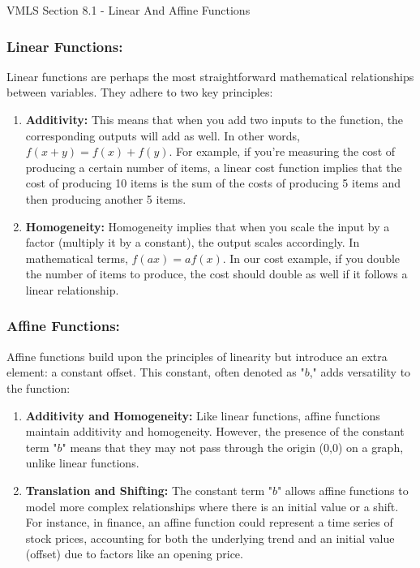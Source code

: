\begin{notes}{VMLS Section 8.1 - Linear And Affine Functions}
    \subsubsection*{Linear Functions:}

    Linear functions are perhaps the most straightforward mathematical relationships between variables. They adhere to two key principles:

    \begin{enumerate}
        \item \textbf{Additivity:} This means that when you add two inputs to the function, the corresponding outputs will add as well. In other words, $f(x + y) = f(x) + f(y)$. For example, if you're 
        measuring the cost of producing a certain number of items, a linear cost function implies that the cost of producing 10 items is the sum of the costs of producing 5 items and then producing 
        another 5 items.
        \item \textbf{Homogeneity:} Homogeneity implies that when you scale the input by a factor (multiply it by a constant), the output scales accordingly. In mathematical terms, $f(ax) = af(x)$. 
        In our cost example, if you double the number of items to produce, the cost should double as well if it follows a linear relationship.
    \end{enumerate}
    
    \subsubsection*{Affine Functions:}
    
    Affine functions build upon the principles of linearity but introduce an extra element: a constant offset. This constant, often denoted as "$b$," adds versatility to the function:

    \begin{enumerate}
        \item \textbf{Additivity and Homogeneity:} Like linear functions, affine functions maintain additivity and homogeneity. However, the presence of the constant term "$b$" means that they may not 
        pass through the origin (0,0) on a graph, unlike linear functions.
        \item \textbf{Translation and Shifting:} The constant term "$b$" allows affine functions to model more complex relationships where there is an initial value or a shift. For instance, in finance, 
        an affine function could represent a time series of stock prices, accounting for both the underlying trend and an initial value (offset) due to factors like an opening price.
    \end{enumerate}


\end{notes}
